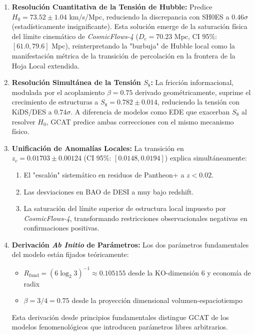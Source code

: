 \documentclass[12pt, a4paper]{article}
\theoremstyle{plain}
\theoremstyle{definition}
\begin{document}
\begin{enumerate}
    \item \textbf{Resolución Cuantitativa de la Tensión de Hubble:} Predice $H_0 = 73.52 \pm 1.04$ km/s/Mpc, reduciendo la discrepancia con SH0ES a $0.46\sigma$ (estadísticamente insignificante). Esta solución emerge de la saturación física del límite cinemático de \textit{CosmicFlows-4} ($D_c = 70.23$ Mpc, CI 95\%: $[61.0, 79.6]$ Mpc), reinterpretando la "burbuja" de Hubble local como la manifestación métrica de la transición de percolación en la frontera de la Hoja Local extendida.
    
    \item \textbf{Resolución Simultánea de la Tensión $S_8$:} La fricción informacional, modulada por el acoplamiento $\beta = 0.75$ derivado geométricamente, suprime el crecimiento de estructuras a $S_8 = 0.782 \pm 0.014$, reduciendo la tensión con KiDS/DES a $0.74\sigma$. A diferencia de modelos como EDE que exacerban $S_8$ al resolver $H_0$, GCAT predice ambas correcciones con el mismo mecanismo físico.
    
    \item \textbf{Unificación de Anomalías Locales:} La transición en $z_c = 0.01703 \pm 0.00124$ (CI 95\%: $[0.0148, 0.0194]$) explica simultáneamente:
    \begin{enumerate}
        \item El "escalón" sistemático en residuos de Pantheon+ a $z < 0.02$.
        \item Las desviaciones en BAO de DESI a muy bajo redshift.
        \item La saturación del límite superior de estructura local impuesto por \textit{CosmicFlows-4}, transformando restricciones observacionales negativas en confirmaciones positivas.
    \end{enumerate}
    
    \item \textbf{Derivación \textit{Ab Initio} de Parámetros:} Los dos parámetros fundamentales del modelo están fijados teóricamente:
    \begin{itemize}
        \item $R_{\text{fund}} = (6\log_2 3)^{-1} \approx 0.105155$ desde la KO-dimensión 6 y economía de radix
        \item $\beta = 3/4 = 0.75$ desde la proyección dimensional volumen-espaciotiempo
    \end{itemize}
    Esta derivación desde principios fundamentales distingue GCAT de los modelos fenomenológicos que introducen parámetros libres arbitrarios.
    

\end{enumerate}
\end{document}

